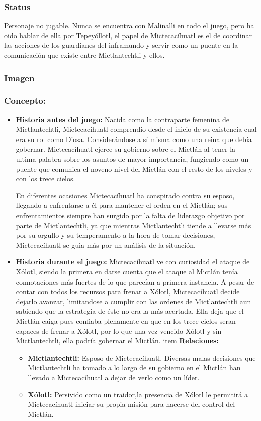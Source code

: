 \documentclass[11pt,letterpaper]{article}
\begin{document}
\subsubsection{Status}
Personaje no jugable.
Nunca se encuentra con Malinalli en todo el juego, pero ha oido hablar de ella por Tepeyóllotl, el papel de Mictecacíhuatl es el de coordinar las acciones de los guardianes del inframundo y servir como un puente en la comunicación que existe entre Mictlantechtli y ellos.
\subsubsection{Imagen}
\subsubsection{Concepto:}
\begin{itemize}
	\item \textbf{Historia antes del juego:}
	Nacida como la contraparte femenina de  Mictlantechtli, Mictecacíhuatl comprendio desde el inicio de su existencia cual era su rol como Diosa. Considerándose a sí misma como una reina que debía gobernar.  Mictecacíhuatl ejerce su gobierno sobre el Mictlán al tener la ultima palabra sobre los asuntos de mayor importancia, fungiendo como un puente que comunica el noveno nivel del Mictlán con el resto de los niveles y con los trece cielos.
	\\
	\par
	En diferentes ocasiones Mictecacíhuatl ha conspirado contra su esposo, llegando a enfrentarse a él para mantener el orden en el Mictlán; sus enfrentamientos siempre han surgido por la falta de liderazgo objetivo por parte de Mictlantechtli, ya que mientras  Mictlantechtli tiende a llevarse más por su orgullo y su temperamento a la hora de tomar decisiones, Mictecacíhuatl se guia más por un análisis de la situación.
	\item \textbf{Historia durante el juego:}
	Mictecacíhuatl ve con curiosidad el ataque de Xólotl, siendo la primera en darse cuenta que el ataque al Mictlán tenía connotaciones más fuertes de lo que parecían a primera instancia. A pesar de contar con todos los recursos para frenar a Xólotl, Mictecacíhuatl decide dejarlo avanzar, limitandose a cumplir con las ordenes de Mictlantechtli aun sabiendo que la estrategia de éste no era la más acertada. Ella deja que el Mictlán caiga pues confiaba plenamente en que en los trece cielos seran capaces de frenar a Xólotl, por lo que una vez vencido Xólotl y sin  Mictlantechtli, ella podría gobernar el Mictlán.
	item \textbf{Relaciones:}
	\begin{itemize}
		\item \textbf{Mictlantechtli:} Esposo de Mictecacíhuatl. Diversas malas decisiones que  Mictlantechtli ha tomado a lo largo de su gobierno en el Mictlán han llevado a Mictecacíhuatl a dejar de verlo como un líder.  
		\item \textbf{Xólotl:} Persivido como un traidor,la presencia de Xólotl le permitirá a Mictecacíhuatl iniciar su propia misión para hacerse del control del Mictlán. 
	\end{itemize}                     
\end{itemize}
\end{document}
